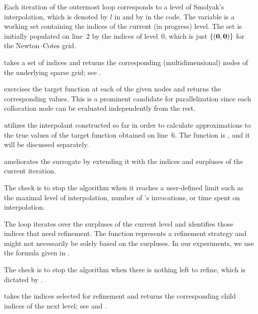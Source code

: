 \begin{compactlist}

 Each iteration of the outermost loop corresponds to a level of
Smolyak's interpolation, which is denoted by $l$ in 
and by  in the code. The  variable is a working set
containing the indices of the current (in progress) level. The set is initially
populated on line~2 by the indices of level~0, which is just $\{ (\mathbf{0}, \mathbf{0})
\}$ for the Newton--Cotes grid.

  takes a set of indices and returns the
corresponding (multidimensional) nodes of the underlying sparse grid; see
.

  exercises the target function at each of the
given nodes and returns the corresponding values. This is a prominent candidate
for parallelization since each collocation node can be evaluated independently
from the rest.

  utilizes the interpolant constructed so far in
order to calculate approximations to the true values of the target function
obtained on line~6. The  function is , and it
will be discussed separately.

  ameliorates the surrogate by extending it
with the indices and surpluses of the current iteration.

 The check is to stop the algorithm when it reaches a
user-defined limit such as the maximal level of interpolation, number of
's invocations, or time spent on interpolation.

 The loop iterates over the surpluses of the current level and
identifies those indices that need refinement. The  function
represents a refinement strategy and might not necessarily be solely based on
the surpluses. In our experiments, we use the formula given in .

 The check is to stop the algorithm when there is nothing left
to refine, which is dictated by .

  takes the indices selected for
refinement and returns the corresponding child indices of the next level; see
 and .

\end{compactlist}

